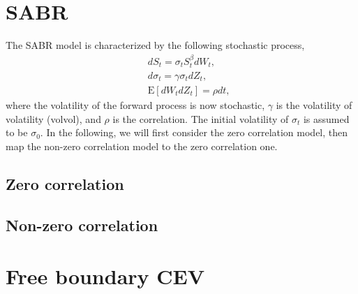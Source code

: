 \documentclass[12pt]{article}
\begin{document}
\section{SABR}

  The SABR model is characterized by the following stochastic process,
  \begin{eqnarray}
    && dS_t=\sigma_t S_t^{\beta}dW_t,\nonumber\\
    && d\sigma_t=\gamma\sigma_tdZ_t,\\
    && {\mathrm E}[dW_tdZ_t]=\rho dt,\nonumber
  \end{eqnarray}
  where the volatility of the forward process is now stochastic, $\gamma$ is the volatility of volatility (volvol),
  and $\rho$ is the correlation. The initial volatility of $\sigma_t$ is assumed to be $\sigma_0$. 
  In the following, we will first consider the zero correlation model, then map the non-zero
  correlation model to the zero correlation one.

  \subsection{Zero correlation}



  \subsection{Non-zero correlation}



\section{Free boundary CEV}
\end{document}
